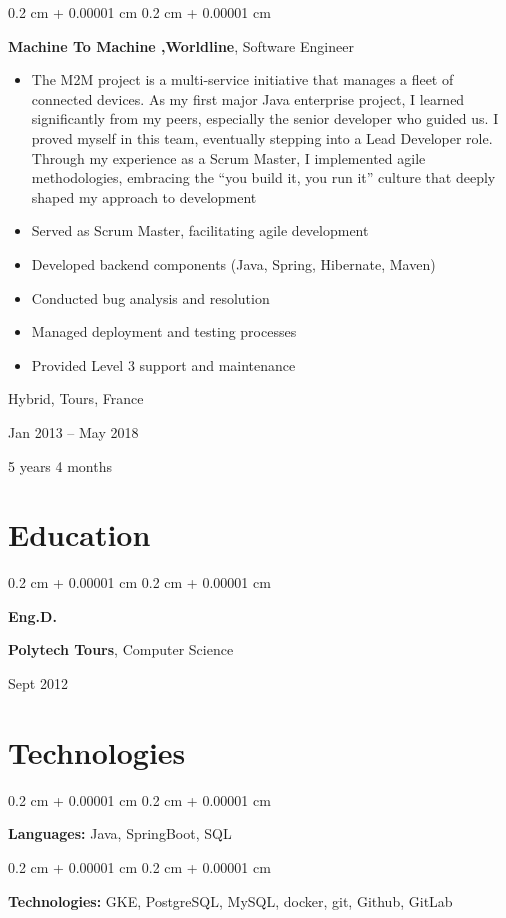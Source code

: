 \documentclass[10pt, letterpaper]{article}
\newenvironment{highlights}{
    \begin{itemize}[
        topsep=0.10 cm,
        parsep=0.10 cm,
        partopsep=0pt,
        itemsep=0pt,
        leftmargin=0.4 cm + 10pt
    ]
}{
    \end{itemize}
} %
\newenvironment{onecolentry}{
    \begin{adjustwidth}{
        0.2 cm + 0.00001 cm
    }{
        0.2 cm + 0.00001 cm
    }
}{
    \end{adjustwidth}
} %
\newenvironment{twocolentry}[2][]{
    \onecolentry
    \def\secondColumn{#2}
    \setcolumnwidth{\fill, 4.5 cm}
    \begin{paracol}{2}
}{
    \switchcolumn \raggedleft \secondColumn
    \end{paracol}
    \endonecolentry
} %
\newenvironment{threecolentry}[3][]{
    \onecolentry
    \def\thirdColumn{#3}
    \setcolumnwidth{1 cm, \fill, 4.5 cm}
    \begin{paracol}{3}
    {\raggedright #2} \switchcolumn
}{
    \switchcolumn \raggedleft \thirdColumn
    \end{paracol}
    \endonecolentry
} %
\begin{document}
        \begin{twocolentry}{
            Hybrid, Tours, France

        Jan 2013 – May 2018

        5 years 4 months
        }
            \textbf{Machine To Machine ,Worldline}, Software Engineer
            \begin{highlights}
                \item The M2M project is a multi-service initiative that manages a fleet of connected devices. As my first major Java enterprise project, I learned significantly from my peers, especially the senior developer who guided us. I proved myself in this team, eventually stepping into a Lead Developer role. Through my experience as a Scrum Master, I implemented agile methodologies, embracing the “you build it, you run it” culture that deeply shaped my approach to development
                \item Served as Scrum Master, facilitating agile development
                \item Developed backend components (Java, Spring, Hibernate, Maven)
                \item Conducted bug analysis and resolution
                \item Managed deployment and testing processes
                \item Provided Level 3 support and maintenance
            \end{highlights}
        \end{twocolentry}



    
    \section{Education}



        
        \begin{threecolentry}{\textbf{Eng.D.}}{
            Sept 2012
        }
            \textbf{Polytech Tours}, Computer Science
        \end{threecolentry}


    
    \section{Technologies}



        
        \begin{onecolentry}
            \textbf{Languages:} Java, SpringBoot, SQL
        \end{onecolentry}

        \vspace{0.2 cm}

        \begin{onecolentry}
            \textbf{Technologies:} GKE, PostgreSQL, MySQL, docker, git, Github, GitLab
        \end{onecolentry}


    
\end{document}
